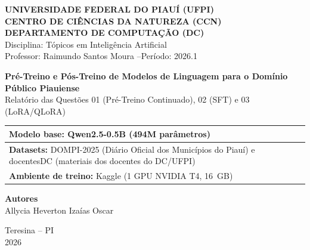 \thispagestyle{empty}

\begin{center}
  \textbf{UNIVERSIDADE FEDERAL DO PIAUÍ (UFPI)}\\
  \textbf{CENTRO DE CIÊNCIAS DA NATUREZA (CCN)}\\
  \textbf{DEPARTAMENTO DE COMPUTAÇÃO (DC)}\\[0.3em]
  Disciplina: Tópicos em Inteligência Artificial\\
  Professor: Raimundo Santos Moura \quad--\quad Período: 2026.1
\end{center}

\vspace{3.5cm}

\begin{center}
  {\Large \textbf{Pré-Treino e Pós-Treino de Modelos de Linguagem para o Domínio Público Piauiense}}\\[0.8em]
  {\large Relatório das Questões 01 (Pré-Treino Continuado), 02 (SFT) e 03 (LoRA/QLoRA)}
\end{center}

\vspace{2.5cm}

\begin{center}
\begin{tabularx}{0.8\textwidth}{|>{\RaggedRight\arraybackslash}X|}
  \hline
  \textbf{Modelo base:} Qwen2.5-0.5B (494M parâmetros)\\
  \hline
  \textbf{Datasets:} DOMPI-2025 (Diário Oficial dos Municípios do Piauí) e docentesDC (materiais dos docentes do DC/UFPI)\\
  \hline
  \textbf{Ambiente de treino:} Kaggle (1 GPU NVIDIA T4, 16~GB)\\
  \hline
\end{tabularx}
\end{center}

\vspace{3cm}

\begin{center}
  \textbf{Autores}\\[0.3em]
  Allycia \quad\textbar\quad Heverton \quad\textbar\quad Izaías \quad\textbar\quad Oscar
\end{center}

\vfill

\begin{center}
  Teresina -- PI\\
  2026
\end{center}
